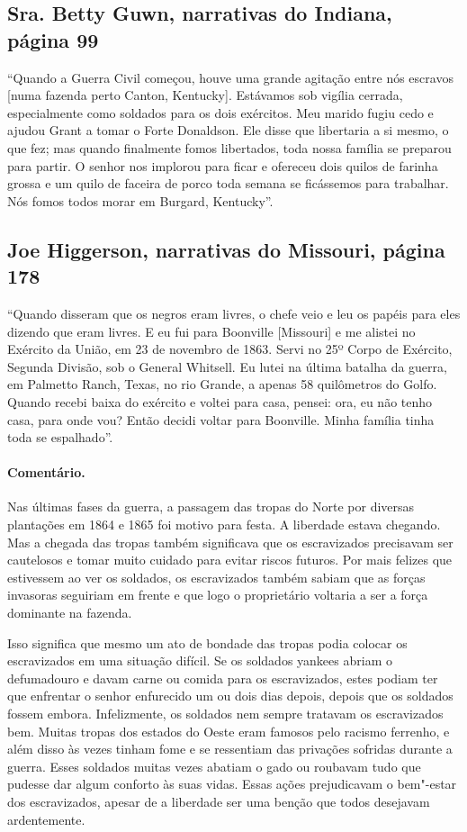 \subsection{Sra. Betty Guwn, narrativas do Indiana, página 99} \label{ref117}

``Quando a Guerra Civil começou, houve uma grande agitação entre nós
escravos {[}numa fazenda perto Canton, Kentucky{]}. Estávamos sob
vigília cerrada, especialmente como soldados para os dois exércitos. Meu
marido fugiu cedo e ajudou Grant a tomar o Forte Donaldson. Ele disse
que libertaria a si mesmo, o que fez; mas quando finalmente fomos
libertados, toda nossa família se preparou para partir. O senhor nos
implorou para ficar e ofereceu dois quilos de farinha grossa e um quilo
de faceira de porco toda semana se ficássemos para trabalhar. Nós fomos
todos morar em Burgard, Kentucky''.

\subsection{Joe Higgerson, narrativas do Missouri, página 178}
\label{ref144}

``Quando disseram que os negros eram livres, o chefe veio e leu os
papéis para eles dizendo que eram livres. E eu fui para Boonville
{[}Missouri{]} e me alistei no Exército da União, em 23 de novembro de
1863. Servi no 25º Corpo de Exército, Segunda Divisão, sob o General
Whitsell. Eu lutei na última batalha da guerra, em Palmetto Ranch,
Texas, no rio Grande, a apenas 58 quilômetros do Golfo. Quando recebi baixa do
exército e voltei para casa, pensei: ora, eu não tenho casa, para onde
vou? Então decidi voltar para Boonville. Minha família tinha toda se
espalhado''.

\paragraph{Comentário.}\quad
{\small
Nas últimas fases da guerra, a passagem das tropas do Norte por
diversas plantações em 1864 e 1865 foi motivo para festa. A liberdade
estava chegando. Mas a chegada das tropas também significava que os
escravizados precisavam ser cautelosos e tomar muito cuidado para evitar
riscos futuros. Por mais felizes que estivessem ao ver os soldados, os
escravizados também sabiam que as forças invasoras seguiriam em frente e que
logo o proprietário voltaria a ser a força dominante na fazenda.

Isso significa que mesmo um ato de bondade das tropas podia
colocar os escravizados em uma situação difícil. Se os soldados yankees
abriam o defumadouro e davam carne ou comida para os escravizados, estes
podiam ter que enfrentar o senhor enfurecido um ou dois dias depois,
depois que os soldados fossem embora. Infelizmente, os soldados nem
sempre tratavam os escravizados bem. Muitas tropas dos estados do Oeste eram
famosos pelo racismo ferrenho, e além disso às vezes tinham fome e se
ressentiam das privações sofridas durante a guerra. Esses soldados
muitas vezes abatiam o gado ou roubavam tudo que pudesse dar algum
conforto às suas vidas. Essas ações prejudicavam o bem"-estar dos
escravizados, apesar de a liberdade ser uma benção que todos desejavam
ardentemente.
}

